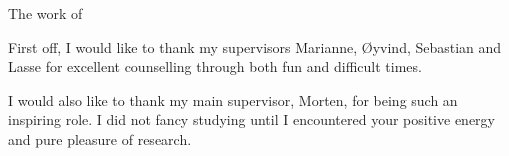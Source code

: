 
The work of

First off, I would like to thank my supervisors Marianne, Øyvind, Sebastian and Lasse for excellent counselling through both fun and difficult times.

I would also like to thank my main supervisor, Morten, for being such an inspiring role. I did not fancy studying until I encountered your positive energy and pure pleasure of research.
